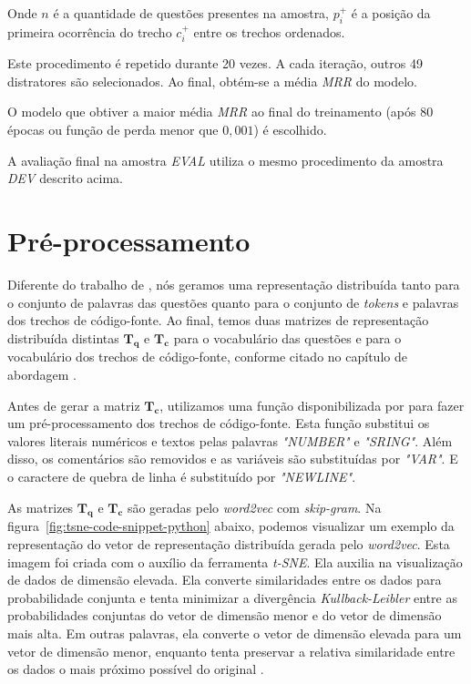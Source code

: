 Onde $n$ é a quantidade de questões presentes na amostra, $p_{i}^{+}$ é a posição da primeira ocorrência do trecho $c_{i}^{+}$ entre os trechos ordenados.

Este procedimento é repetido durante 20 vezes. A cada iteração, outros 49 distratores são selecionados. Ao final, obtém-se a média \emph{MRR} do modelo.

O modelo que obtiver a maior média \emph{MRR} ao final do treinamento (após 80 épocas ou função de perda menor que $0,001$) é escolhido.

A avaliação final na amostra \emph{EVAL} utiliza o mesmo procedimento da amostra \emph{DEV} descrito acima.

\section{Pré-processamento}

Diferente do trabalho de \cite{tan-lstm-qa}, nós geramos uma representação distribuída tanto para o conjunto de palavras das questões quanto para o conjunto de \textit{tokens} e palavras dos trechos de código-fonte. Ao final, temos duas matrizes de representação distribuída distintas $\bm{T_{q}}$ e $\bm{T_{c}}$ para o vocabulário das questões e para o vocabulário dos trechos de código-fonte, conforme citado no capítulo de abordagem .

Antes de gerar a matriz $\bm{T_{c}}$, utilizamos uma função disponibilizada por \cite{yao-2018} para fazer um pré-processamento dos trechos de código-fonte. Esta função substitui os valores literais numéricos e textos pelas palavras \emph{"NUMBER"} e \emph{"SRING"}. Além disso, os comentários são removidos e as variáveis são substituídas por \emph{"VAR"}. E o caractere de quebra de linha é substituído por \emph{"NEWLINE"}.

As matrizes $\bm{T_{q}}$ e $\bm{T_{c}}$ são geradas pelo \textit{word2vec} com \textit{skip-gram}. Na figura~\ref{fig:tsne-code-snippet-python} abaixo, podemos visualizar um exemplo da representação do vetor de representação distribuída gerada pelo \textit{word2vec}. Esta imagem foi criada com o auxílio da ferramenta \textit{t-SNE}. Ela auxilia na visualização de dados de dimensão elevada. Ela converte similaridades entre os dados para probabilidade conjunta e tenta minimizar a divergência \emph{Kullback-Leibler} entre as probabilidades conjuntas do vetor de dimensão menor e do vetor de dimensão mais alta. Em outras palavras, ela converte o vetor de dimensão elevada para um vetor de dimensão menor, enquanto tenta preservar a relativa similaridade entre os dados o mais próximo possível do original \citep{scikit-learn-tsne-2019, quora-tsne-2019}.


